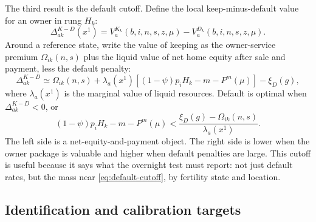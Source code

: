 \documentclass[11pt]{article}
\begin{document}
The third result is the default cutoff. Define the local keep-minus-default value for an owner in rung $H_k$:
\begin{equation}
    \Delta^{K-D}_{ak}(x^1)=V^{K_k}_a(b,i,n,s,z,\mu)-V^{D_k}_a(b,i,n,s,z,\mu).
\end{equation}
Around a reference state, write the value of keeping as the owner-service premium $\Omega_{ik}(n,s)$ plus the liquid value of net home equity after sale and payment, less the default penalty:
\begin{equation}
    \Delta^{K-D}_{ak}
    \simeq
    \Omega_{ik}(n,s)
    +\lambda_a(x^1)\left[(1-\psi)p_iH_k-m-P^m(\mu)\right]
    -\xi_D(g),
    \label{eq:default-linearized}
\end{equation}
where $\lambda_a(x^1)$ is the marginal value of liquid resources. Default is optimal when $\Delta^{K-D}_{ak}<0$, or
\begin{equation}
    (1-\psi)p_iH_k-m-P^m(\mu)
    <
    \frac{\xi_D(g)-\Omega_{ik}(n,s)}{\lambda_a(x^1)}.
    \label{eq:default-cutoff}
\end{equation}
The left side is a net-equity-and-payment object. The right side is lower when the owner package is valuable and higher when default penalties are large. This cutoff is useful because it says what the overnight test must report: not just default rates, but the mass near \eqref{eq:default-cutoff}, by fertility state and location.

\subsection{Identification and calibration targets}
\end{document}
